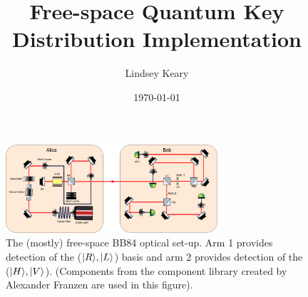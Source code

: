 \documentclass[
 a4paper,twocolumn,showpacs,aip,groupedaddress,%
  eqsecnum,notitlepage,showkeys,cha,longbibliography,10pt
]{revtex4-1}
\DeclarePairedDelimiter\ket{\lvert}{\rangle}
\begin{document}
\title{\LARGE{Free-space Quantum Key Distribution Implementation}}

\author{Lindsey Keary}
\date{\today}

\begin{footnotesize}

\end{footnotesize}

\maketitle
\begin{footnotesize}

\begin{figure}[ht]
\centering
\includegraphics[width=0.7\textwidth,keepaspectratio]{drawing1}
\caption{\label{fig:opticalsetup}The (mostly) free-space BB84 optical set-up. Arm 1 provides detection of the ($\ket{R},\ket{L}$) basis and arm 2 provides detection of the ($\ket{H},\ket{V}$). (Components from the component library created by  Alexander Franzen are used in this figure).}
\end{figure}



% 






\end{footnotesize}



\tiny

\end{document}
